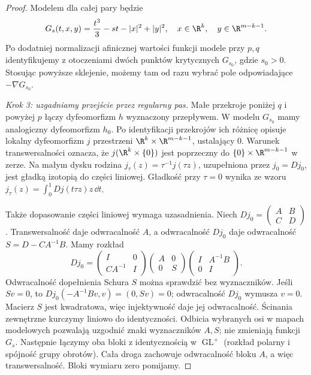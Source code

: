 \begin{proof}
Modelem dla całej pary będzie
\begin{equation}\label{eq:narodziny-uchwytow-18}
 G_s(t,x,y)=\frac{t^3}{3}-st-|x|^2+|y|^2,
 \quad x\in\R^k,\quad y\in\R^{m-k-1}.
\end{equation}
Po dodatniej normalizacji afinicznej wartości funkcji
modele przy $p,q$ identyfikujemy z otoczeniami dwóch
punktów krytycznych $G_{s_0}$, gdzie $s_0>0$.
Stosując powyższe sklejenie, możemy tam od razu
wybrać pole odpowiadające $-\nabla G_{s_0}$.

\emph{Krok 3: uzgadniamy przejście przez regularny pas.}
Małe przekroje poniżej $q$ i powyżej $p$ łączy
dyfeomorfizm $h$ wyznaczony przepływem.
W modelu $G_{s_0}$ mamy analogiczny dyfeomorfizm $h_0$.
Po identyfikacji przekrojów ich różnicę opisuje lokalny
dyfeomorfizm $j$ przestrzeni $\R^k\times\R^{m-k-1}$,
ustalający $0$. Warunek transwersalności oznacza,
że $j(\R^k\times\{0\})$ jest poprzeczny do
$\{0\}\times\R^{m-k-1}$ w zerze.
Na małym dysku rodzina $j_\tau(z)=\tau^{-1}j(\tau z)$,
uzupełniona przez $j_0=Dj_0$, jest gładką izotopią
do części liniowej. Gładkość przy $\tau=0$ wynika ze wzoru
$j_\tau(z)=\int_0^1 Dj(t\tau z)z\,\dd t$.

Także dopasowanie części liniowej wymaga uzasadnienia.
Niech $Dj_0=\left(\begin{smallmatrix}A&B\\C&D\end{smallmatrix}\right)$.
Transwersalność daje odwracalność $A$, a odwracalność
$Dj_0$ daje odwracalność $S=D-CA^{-1}B$.
Mamy rozkład
\[
 Dj_0=
 \begin{pmatrix}I&0\\CA^{-1}&I\end{pmatrix}
 \begin{pmatrix}A&0\\0&S\end{pmatrix}
 \begin{pmatrix}I&A^{-1}B\\0&I\end{pmatrix}.
\]
Odwracalność dopełnienia Schura $S$ można sprawdzić bez wyznaczników.
Jeśli $Sv=0$, to $Dj_0(-A^{-1}Bv,v)=(0,Sv)=0$;
odwracalność $Dj_0$ wymusza $v=0$.
Macierz $S$ jest kwadratowa, więc injektywność daje jej odwracalność.
Ścinania zewnętrzne kurczymy liniowo do identyczności.
Odbicia wybranych osi w mapach modelowych pozwalają
uzgodnić znaki wyznaczników $A,S$; nie zmieniają funkcji $G_s$.
Następnie łączymy oba bloki z identycznością w
$\operatorname{GL}^+$ (rozkład polarny i spójność grupy
obrotów). Cała droga zachowuje odwracalność bloku $A$,
a więc transwersalność. Bloki wymiaru zero pomijamy.


\end{proof}
